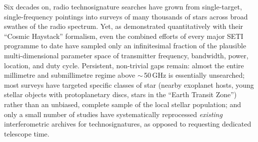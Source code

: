 \documentclass{openjournal}
\begin{document}
Six decades on, radio technosignature searches have grown from single-target,
single-frequency pointings into surveys of many thousands of stars across broad
swathes of the radio spectrum. Yet, as \citet{Wright2018} demonstrated
quantitatively with their ``Cosmic Haystack'' formalism, even the combined efforts
of every major SETI programme to date have sampled only an infinitesimal fraction
of the plausible multi-dimensional parameter space of transmitter frequency,
bandwidth, power, location, and duty cycle. Persistent, non-trivial gaps remain:
almost the entire millimetre and submillimetre regime above $\sim$\,50\,GHz is
essentially unsearched; most surveys have targeted specific classes of star
(nearby exoplanet hosts, young stellar objects with protoplanetary discs, stars in
the ``Earth Transit Zone'') rather than an unbiased, complete sample of the local
stellar population; and only a small number of studies have systematically
reprocessed \emph{existing} interferometric archives for technosignatures, as
opposed to requesting dedicated telescope time.
\end{document}
